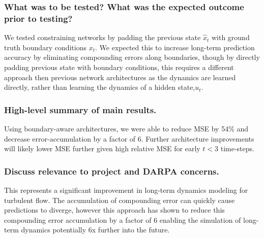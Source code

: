 \documentclass[12pt]{article}
\theoremstyle{plain}
\theoremstyle{remark}
\theoremstyle{definition}
\begin{document}
\subsubsection{What was to be tested? What was the expected outcome prior to testing?}
	We tested constraining networks by padding the previous state $\hat{x}_t$ with ground truth boundary conditions $x_t$. We expected this to increase long-term prediction accuracy by eliminating compounding errors along boundaries, though by directly padding previous state with boundary conditions, this requires a different approach then previous network architectures as the dynamics are learned directly, rather than learning the dynamics of a hidden state,$u_t$.


\subsubsection{High-level summary of main results.}
Using boundary-aware architectures, we were able to reduce MSE by 54\% and decrease error-accumulation by a factor of 6. Further architecture improvements will likely lower MSE further given high relative MSE for early $t < 3$ time-steps.


\subsubsection{Discuss relevance to project and DARPA concerns.}
This represents a significant improvement in long-term dynamics modeling for turbulent flow. The accumulation of compounding error can quickly cause predictions to diverge, however this approach has shown to reduce this compounding error accumulation by a factor of 6 enabling the simulation of long-term dynamics potentially 6x further into the future.
\end{document}
